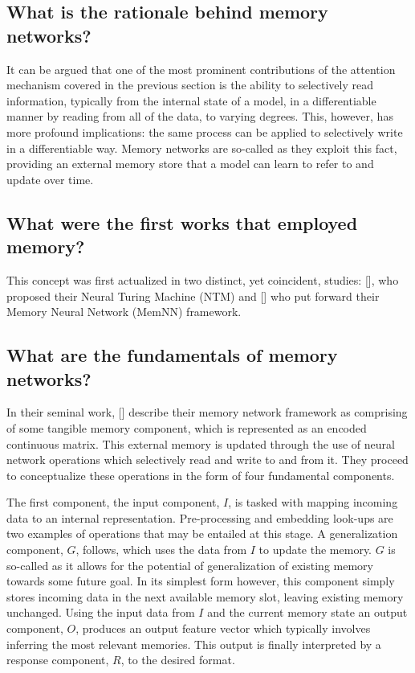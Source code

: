 \documentclass[12pt, a4paper]{report}
\theoremstyle{definition}
\theoremstyle{definition}%
\theoremstyle{definition}%
\theoremstyle{definition}%
\theoremstyle{definition}%
\theoremstyle{definition}%
\renewcommand{\cite}[1]{[\citealp{#1}]}
\begin{document}
\subsection{What is the rationale behind memory networks?}
It can be argued that one of the most prominent contributions of the attention mechanism covered in the previous section is the ability to selectively read information, typically from the internal state of a model, in a differentiable manner by reading from all of the data, to varying degrees. This, however, has more profound implications: the same process can be applied to selectively write in a differentiable way. Memory networks are so-called as they exploit this fact, providing an external memory store that a model can learn to refer to and update over time.

\subsection{What were the first works that employed memory?}
This concept was first actualized in two distinct, yet coincident, studies: \cite{alexgraves2014}, who proposed their Neural Turing Machine (NTM) and \cite{jasonweston2014} who put forward their Memory Neural Network (MemNN) framework.

\subsection{What are the fundamentals of memory networks?}
In their seminal work, \cite{jasonweston2014} describe their memory network framework as comprising of some tangible memory component, which is represented as an encoded continuous matrix. This external memory is updated through the use of neural network operations which selectively read and write to and from it. They proceed to conceptualize these operations in the form of four fundamental components.

The first component, the input component, $I$, is tasked with mapping incoming data to an internal representation. Pre-processing and embedding look-ups are two examples of operations that may be entailed at this stage. A generalization component, $G$, follows, which uses the data from $I$ to update the memory. $G$ is so-called as it allows for the potential of  generalization of existing memory towards some future goal. In its simplest form however, this component simply stores incoming data in the next available memory slot, leaving existing memory unchanged. Using the input data from $I$ and the current memory state an output component, $O$, produces an output feature vector which typically involves inferring the most relevant memories. This output is finally interpreted by a response component, $R$, to the desired format.
\end{document}
